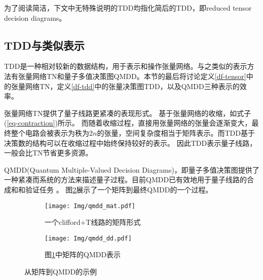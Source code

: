 为了阅读简洁，下文中无特殊说明的TDD均指化简后的TDD，即reduced tensor decision diagrams。


\subsection{TDD与类似表示}
\label{sec-compare}
TDD是一种相对较新的数据结构，用于表示和操作张量网络。与之类似的表示方法有张量网络TN和量子多值决策图QMDD。本节的最后将讨论定义\ref{df-tensor}中的张量网络TN，定义\ref{df-tdd}中的张量决策图TDD，以及QMDD\citep{1623982}三种表示的效率。

张量网络TN提供了量子线路更紧凑的表现形式。
基于张量网络的收缩，如式子(\ref{eq-contraction})所示。
而随着收缩过程，直接用张量网络的张量会逐渐变大，最终整个电路会被表示为秩为$2n$的张量，空间复杂度相当于矩阵表示。而TDD基于决策数的结构可以在收缩过程中始终保持较好的表示。
因此TDD表示量子线路，一般会比TN节省更多资源。

QMDD(Quantum Multiple-Valued Decision Diagrams)，即量子多值决策图提供了一种紧凑而系统的方法来描述量子过程。目前QMDD已有效地用于量子线路的合成\citep{niemann2020advanced}和和验证任务
\citep{burgholzer2020verifying,burgholzer2020advanced}。
图\ref{fig:qmdd-basic}展示了一个矩阵到最终QMDD的一个过程。
\begin{figure}[htbp]
    \centering
    \begin{subfigure}[b]{.45\textwidth}
        \centering
        \texttt{[image: Img/qmdd\_mat.pdf]}
        \caption{一个clifford+T线路的矩阵形式}
        \label{fig:qmdd_mat}
    \end{subfigure}
    \qquad
    \begin{subfigure}[b]{.45\textwidth}
        \centering
        \texttt{[image: Img/qmdd\_dd.pdf]}
        \caption{图\ref{fig:qmdd_mat}中矩阵的QMDD表示}
    \end{subfigure}
    \caption{从矩阵到QMDD的示例\citep{niemann2020advanced}}
    \label{fig:qmdd-basic}
\end{figure}


